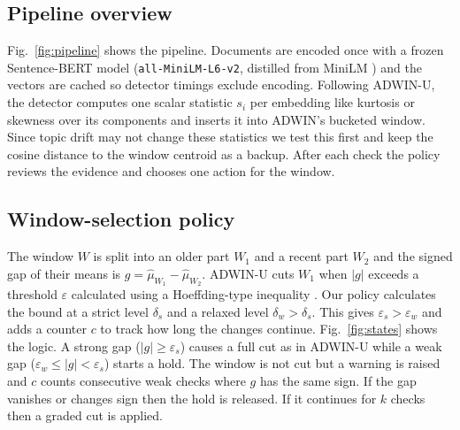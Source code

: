\documentclass[conference]{IEEEtran}
\begin{document}
\subsection{Pipeline overview}

Fig.~\ref{fig:pipeline} shows the pipeline. Documents are encoded once with a frozen Sentence-BERT model (\texttt{all-MiniLM-L6-v2}, distilled from MiniLM \cite{wang2020}) and the vectors are cached so detector timings exclude encoding. Following ADWIN-U, the detector computes one scalar statistic $s_i$ per embedding like kurtosis or skewness over its components and inserts it into ADWIN's bucketed window. Since topic drift may not change these statistics we test this first and keep the cosine distance to the window centroid as a backup. After each check the policy reviews the evidence and chooses one action for the window.



\subsection{Window-selection policy}

The window $W$ is split into an older part $W_1$ and a recent part $W_2$ and the signed gap of their means is $g=\hat\mu_{W_1}-\hat\mu_{W_2}$. ADWIN-U cuts $W_1$ when $|g|$ exceeds a threshold $\varepsilon$ calculated using a Hoeffding-type inequality \cite{bifet2007}. Our policy calculates the bound at a strict level $\delta_s$ and a relaxed level $\delta_w>\delta_s$. This gives $\varepsilon_s>\varepsilon_w$ and adds a counter $c$ to track how long the changes continue. Fig.~\ref{fig:states} shows the logic. A strong gap ($|g|\ge\varepsilon_s$) causes a full cut as in ADWIN-U while a weak gap ($\varepsilon_w\le|g|<\varepsilon_s$) starts a hold. The window is not cut but a warning is raised and $c$ counts consecutive weak checks where $g$ has the same sign. If the gap vanishes or changes sign then the hold is released. If it continues for $k$ checks then a graded cut is applied.
\end{document}
